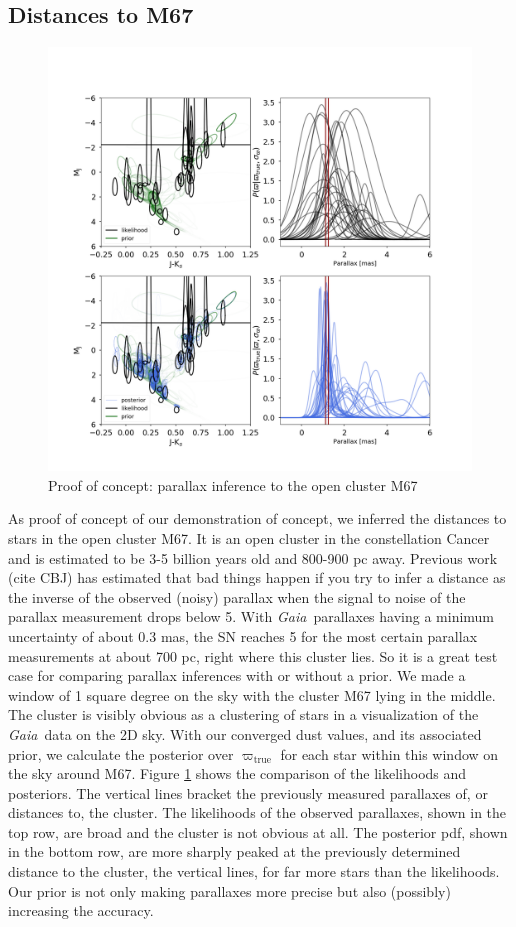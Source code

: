 \documentclass[modern]{aastex61}
\newcommand{\project}[1]{\textsl{#1}}
\newcommand{\gaia}{\project{Gaia}}
\newcommand{\true}{\mathrm{true}}
\begin{document}
\subsection{Distances to M67}
\begin{figure}
\centering
  \includegraphics[width=\textwidth]{distancesM67.png}
\caption{Proof of concept: parallax inference to the open cluster M67}
\label{fig:m67}
\end{figure}

As proof of concept of our demonstration of concept, we inferred the distances to stars in the open cluster M67. It is an open cluster in the constellation Cancer and is estimated to be 3-5 billion years old and 800-900 pc away. Previous work (cite CBJ) has estimated that bad things happen if you try to infer a distance as the inverse of the observed (noisy) parallax when the signal to noise of the parallax measurement drops below 5. With \gaia\ parallaxes having a minimum uncertainty of about 0.3 mas, the SN reaches 5 for the most certain parallax measurements at about 700 pc, right where this cluster lies. So it is a great test case for comparing parallax inferences with or without a prior. We made a window of 1 square degree on the sky with the cluster M67 lying in the middle. The cluster is visibly obvious as a clustering of stars in a visualization of the \gaia\ data on the 2D sky. With our converged dust values, and its associated prior, we calculate the posterior over $\varpi_{\true}$ for each star within this window on the sky around M67. Figure \ref{fig:m67} shows the comparison of the likelihoods and posteriors. The vertical lines bracket the previously measured parallaxes of, or distances to, the cluster. The likelihoods of the observed parallaxes, shown in the top row, are broad and the cluster is not obvious at all. The posterior pdf, shown in the bottom row, are more sharply peaked at the previously determined distance to the cluster, the vertical lines, for far more stars than the likelihoods. Our prior is not only making parallaxes more precise but also (possibly) increasing the accuracy.
\end{document}
